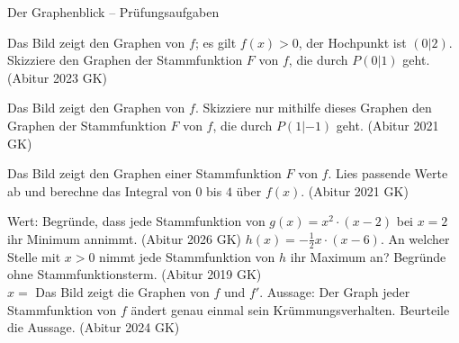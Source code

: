 \begin{aufgabe}{Der Graphenblick – Prüfungsaufgaben}
\begin{teile}
\teil Das Bild zeigt den Graphen von $f$; es gilt $f(x) > 0$, der Hochpunkt ist $(0 | 2)$. Skizziere den Graphen der Stammfunktion $F$ von $f$, die durch $P(0 | 1)$ geht. \hfill (Abitur 2023 GK)

\begin{ksys}[xmin=-4,xmax=4,ymin=-2,ymax=4]   \end{ksys}
\teil Das Bild zeigt den Graphen von $f$. Skizziere nur mithilfe dieses Graphen den Graphen der Stammfunktion $F$ von $f$, die durch $P(1 | -1)$ geht. \hfill (Abitur 2021 GK)

\begin{ksys}[xmin=-4,xmax=3,ymin=-2,ymax=4]   \end{ksys}
\teil Das Bild zeigt den Graphen einer Stammfunktion $F$ von $f$. Lies passende Werte ab und berechne das Integral von $0$ bis $4$ über $f(x)$. \hfill (Abitur 2021 GK) \\

\begin{ksys}[xmin=-1,xmax=6,ymin=-1,ymax=5,ablesen]  \end{ksys}
Wert: \leerfeld
\teil Begründe, dass jede Stammfunktion von $g(x) = x^2 \cdot (x - 2)$ bei $x = 2$ ihr Minimum annimmt. \hfill (Abitur 2026 GK)
\teil $h(x) = -\frac{1}{2}x \cdot (x - 6)$. An welcher Stelle mit $x > 0$ nimmt jede Stammfunktion von $h$ ihr Maximum an? Begründe ohne Stammfunktionsterm. \hfill (Abitur 2019 GK) \\ $x = $ \leerfeld
\teil Das Bild zeigt die Graphen von $f$ und $f'$. Aussage: Der Graph jeder Stammfunktion von $f$ ändert genau einmal sein Krümmungsverhalten. Beurteile die Aussage. \hfill (Abitur 2024 GK) \\  \\ 

\begin{ksys}[xmin=-3,xmax=3,ymin=-3,ymax=6,ablesen]   \end{ksys}
\end{teile}
\end{aufgabe}

